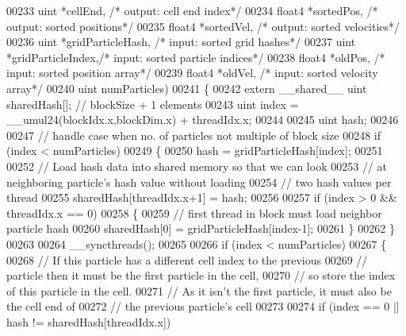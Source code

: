 \begin{DoxyCode}
00233                                   uint   *cellEnd,          \textcolor{comment}{/* output: cell end index*/}
00234                                   float4 *sortedPos,        \textcolor{comment}{/* output: sorted positions*/}
00235                                   float4 *sortedVel,        \textcolor{comment}{/* output: sorted velocities*/}
00236                                   uint   *gridParticleHash, \textcolor{comment}{/* input: sorted grid hashes*/}
00237                                   uint   *gridParticleIndex,\textcolor{comment}{/* input: sorted particle indices*/}
00238                                   float4 *oldPos,           \textcolor{comment}{/* input: sorted position array*/}
00239                                   float4 *oldVel,           \textcolor{comment}{/* input: sorted velocity array*/}
00240                                   uint    numParticles)
00241 \{
00242     \textcolor{keyword}{extern} \_\_shared\_\_ uint sharedHash[];    \textcolor{comment}{// blockSize + 1 elements}
00243     uint index = \_\_umul24(blockIdx.x,blockDim.x) + threadIdx.x;
00244 
00245     uint hash;
00246 
00247     \textcolor{comment}{// handle case when no. of particles not multiple of block size}
00248     \textcolor{keywordflow}{if} (index < numParticles)
00249     \{
00250         hash = gridParticleHash[index];
00251 
00252         \textcolor{comment}{// Load hash data into shared memory so that we can look}
00253         \textcolor{comment}{// at neighboring particle's hash value without loading}
00254         \textcolor{comment}{// two hash values per thread}
00255         sharedHash[threadIdx.x+1] = hash;
00256 
00257         \textcolor{keywordflow}{if} (index > 0 && threadIdx.x == 0)
00258         \{
00259             \textcolor{comment}{// first thread in block must load neighbor particle hash}
00260             sharedHash[0] = gridParticleHash[index-1];
00261         \}
00262     \}
00263 
00264     \_\_syncthreads();
00265 
00266     \textcolor{keywordflow}{if} (index < numParticles)
00267     \{
00268         \textcolor{comment}{// If this particle has a different cell index to the previous}
00269         \textcolor{comment}{// particle then it must be the first particle in the cell,}
00270         \textcolor{comment}{// so store the index of this particle in the cell.}
00271         \textcolor{comment}{// As it isn't the first particle, it must also be the cell end of}
00272         \textcolor{comment}{// the previous particle's cell}
00273 
00274         \textcolor{keywordflow}{if} (index == 0 || hash != sharedHash[threadIdx.x])

\end{DoxyCode}
